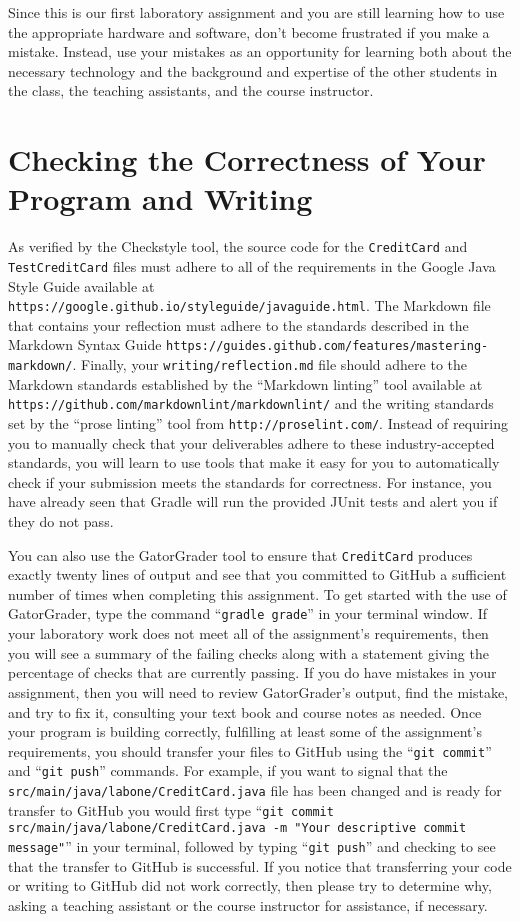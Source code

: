 \documentclass[11pt]{article}
\newcommand{\mainprogram}{\lstinline{CreditCard}}
\newcommand{\mainprogramsource}{\lstinline{src/main/java/labone/CreditCard.java}}
\newcommand{\testprogram}{\lstinline{TestCreditCard}}
\newcommand{\reflection}{\lstinline{writing/reflection.md}}
\newcommand{\gatorgraderstart}{\command{gradle grade}}
\newcommand{\gitcommit}{\command{git commit}}
\newcommand{\gitpush}{\command{git push}}
\newcommand{\gitcommitmainprogram}{\command{git commit src/main/java/labone/CreditCard.java -m "Your
descriptive commit message"}}
\newcommand{\command}[1]{``\lstinline{#1}''}
\newcommand{\url}[1]{\lstinline{#1}}
\newcommand{\step}[1]{``{#1}''}
\begin{document}
Since this is our first laboratory assignment and you are still learning how to
use the appropriate hardware and software, don't become frustrated if you make a
mistake. Instead, use your mistakes as an opportunity for learning both about
the necessary technology and the background and expertise of the other students
in the class, the teaching assistants, and the course instructor.

\section*{Checking the Correctness of Your Program and Writing}

As verified by the Checkstyle tool, the source code for the \mainprogram{} and
\testprogram{} files must adhere to all of the requirements in the Google Java
Style Guide available at
\url{https://google.github.io/styleguide/javaguide.html}. The Markdown file that
contains your reflection must adhere to the standards described in the Markdown
Syntax Guide \url{https://guides.github.com/features/mastering-markdown/}.
Finally, your \reflection{} file should adhere to the Markdown standards
established by the \step{Markdown linting} tool available at
\url{https://github.com/markdownlint/markdownlint/} and the writing standards
set by the \step{prose linting} tool from \url{http://proselint.com/}. Instead
of requiring you to manually check that your deliverables adhere to these
industry-accepted standards, you will learn to use tools that make it easy for
you to automatically check if your submission meets the standards for
correctness. For instance, you have already seen that Gradle will run the
provided JUnit tests and alert you if they do not pass.

You can also use the GatorGrader tool to ensure that \mainprogram{} produces
exactly twenty lines of output and see that you committed to GitHub a sufficient
number of times when completing this assignment. To get started with the use of
GatorGrader, type the command \gatorgraderstart{} in your terminal window. If
your laboratory work does not meet all of the assignment's requirements, then
you will see a summary of the failing checks along with a statement giving the
percentage of checks that are currently passing. If you do have mistakes in your
assignment, then you will need to review GatorGrader's output, find the mistake,
and try to fix it, consulting your text book and course notes as needed. Once
your program is building correctly, fulfilling at least some of the assignment's
requirements, you should transfer your files to GitHub using the \gitcommit{}
and \gitpush{} commands. For example, if you want to signal that the
\mainprogramsource{} file has been changed and is ready for transfer to GitHub
you would first type \gitcommitmainprogram{} in your terminal, followed by
typing \gitpush{} and checking to see that the transfer to GitHub is successful.
If you notice that transferring your code or writing to GitHub did not work
correctly, then please try to determine why, asking a teaching assistant or the
course instructor for assistance, if necessary.
\end{document}
